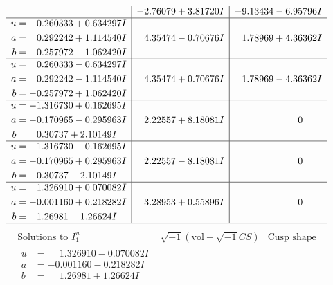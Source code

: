 \documentclass[1p]{elsarticle_modified}
\theoremstyle{definition}
\newcommand{\I}{\sqrt{-1}}
\begin{document}
$$\begin{array}{c|c|c}
 & -2.76079 + 3.81720 I & -9.13434 - 6.95796 I \\ \hline\begin{aligned}
u &= \phantom{-}0.260333 + 0.634297 I \\
a &= \phantom{-}0.292242 + 1.114540 I \\
b &= -0.257972 - 1.062420 I\end{aligned}
 & \phantom{-}4.35474 - 0.70676 I & \phantom{-}1.78969 + 4.36362 I \\ \hline\begin{aligned}
u &= \phantom{-}0.260333 - 0.634297 I \\
a &= \phantom{-}0.292242 - 1.114540 I \\
b &= -0.257972 + 1.062420 I\end{aligned}
 & \phantom{-}4.35474 + 0.70676 I & \phantom{-}1.78969 - 4.36362 I \\ \hline\begin{aligned}
u &= -1.316730 + 0.162695 I \\
a &= -0.170965 - 0.295963 I \\
b &= \phantom{-}0.30737 + 2.10149 I\end{aligned}
 & \phantom{-}2.22557 + 8.18081 I & \phantom{-0.000000 } 0 \\ \hline\begin{aligned}
u &= -1.316730 - 0.162695 I \\
a &= -0.170965 + 0.295963 I \\
b &= \phantom{-}0.30737 - 2.10149 I\end{aligned}
 & \phantom{-}2.22557 - 8.18081 I & \phantom{-0.000000 } 0 \\ \hline\begin{aligned}
u &= \phantom{-}1.326910 + 0.070082 I \\
a &= -0.001160 + 0.218282 I \\
b &= \phantom{-}1.26981 - 1.26624 I\end{aligned}
 & \phantom{-}3.28953 + 0.55896 I & \phantom{-0.000000 } 0\\
 \hline 
 \end{array}$$\newpage$$\begin{array}{c|c|c}  
\text{Solutions to }I^u_{1}& \I (\text{vol} + \sqrt{-1}CS) & \text{Cusp shape}\\
 \hline 
\begin{aligned}
u &= \phantom{-}1.326910 - 0.070082 I \\
a &= -0.001160 - 0.218282 I \\
b &= \phantom{-}1.26981 + 1.26624 I\end{aligned}

\end{array}$$
\end{document}
